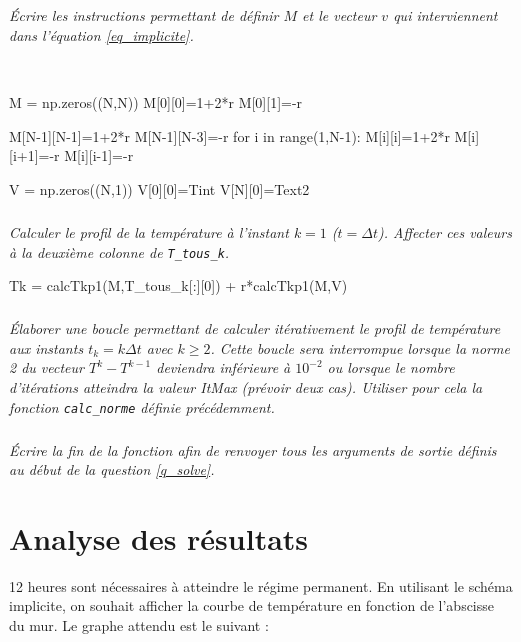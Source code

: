 \documentclass[10pt,fleqn]{article} %
\begin{document}
\subparagraph{}
\textit{Écrire les instructions permettant de définir $M$ et le vecteur $v$ qui interviennent dans l'équation \ref{eq_implicite}. }
\ifprof
\begin{corrige} ~\\
\begin{python}
M = np.zeros((N,N))
M[0][0]=1+2*r
M[0][1]=-r

M[N-1][N-1]=1+2*r
M[N-1][N-3]=-r
for i in range(1,N-1):
    M[i][i]=1+2*r
    M[i][i+1]=-r
    M[i][i-1]=-r

V = np.zeros((N,1))
V[0][0]=Tint
V[N][0]=Text2
\end{python}
\end{corrige}

\else
\fi


\subparagraph{}
\textit{Calculer le profil de la température à l'instant $k=1$ ($t=\Delta t$). Affecter ces valeurs à la deuxième colonne de \texttt{T\_tous\_k}.}
\ifprof
\begin{corrige}
\begin{python}
Tk =  calcTkp1(M,T_tous_k[:][0]) + r*calcTkp1(M,V) 
\end{python}
\end{corrige}
\else
\fi


\subparagraph{}
\textit{Élaborer une boucle permettant de calculer itérativement le profil de température aux instants $t_k = k \Delta t$ avec $k\geq 2$. Cette boucle sera interrompue lorsque la norme 2 du vecteur $T^k-T^{k-1}$ deviendra inférieure à $10^{-2}$ ou lorsque le nombre d'itérations atteindra la valeur ItMax (prévoir deux cas). Utiliser pour cela la fonction \texttt{calc\_norme} définie précédemment.}
\ifprof
\begin{corrige}
\end{corrige}
\else
\fi



\subparagraph{}
\textit{Écrire la fin de la fonction afin de renvoyer tous les arguments de sortie définis au
début de la question \ref{q_solve}.}
\ifprof

\begin{corrige}
\end{corrige}
\else
\fi


\section{Analyse des résultats}
12 heures sont nécessaires à atteindre le régime permanent. En utilisant le schéma implicite, on souhait afficher la courbe de température en fonction de l'abscisse du mur. Le graphe attendu est le suivant :
\end{document}
